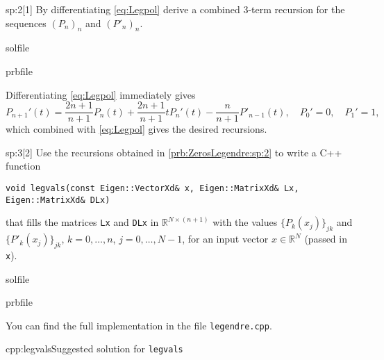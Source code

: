 \begin{samproblem}
\begin{subproblem}{sp:2}[1]
By differentiating \cref{eq:Legpol} derive a combined 3-term recursion for the sequences $(P_n)_n$ and $(P'_n)_n$.
  \begin{samwriteprbpart}{solfile}
    \begin{writeverbatim}{prbfile}
      \begin{samsolution}
        Differentiating \cref{eq:Legpol} immediately gives
        \begin{equation*}
          P_{n+1}'(t)=\frac{2n+1}{n+1}P_n(t) + \frac{2n+1}{n+1} t P_n'(t)-\frac{n}{n+1}P'_{n-1}(t),\quad P_0'=0,\quad P_1'=1,
        \end{equation*}
        which combined with \cref{eq:Legpol} gives the desired recursions.
     \end{samsolution}
    \end{writeverbatim}
  \end{samwriteprbpart}

\end{subproblem}

\begin{subproblem}{sp:3}[2]
  Use the recursions obtained in \ref{prb:ZerosLegendre:sp:2} to write a C++ function
  \begin{lstlisting}[style=cpp]
void legvals(const Eigen::VectorXd& x, Eigen::MatrixXd& Lx, Eigen::MatrixXd& DLx)
  \end{lstlisting}
  that fills the matrices \texttt{Lx} and \texttt{DLx} in $\mathbb{R}^{N\times (n+1)}$ with the values $\{P_k(x_j)\}_{jk}$ and 
  $\{P'_k(x_j)\}_{jk}$, $k=0,\dots,n$, $j=0,\dots,N-1$, for an input vector $x\in \mathbb{R}^N$ (passed in \texttt{x}).
  \begin{samwriteprbpart}{solfile}
    \begin{writeverbatim}{prbfile}
      \begin{samsolution}
        You can find the full implementation in the file \texttt{legendre.cpp}.
        \begin{samcode}[C++-code]{cpp:legvals}{Suggested solution for \texttt{legvals}}
        \end{samcode}
      \end{samsolution}
    \end{writeverbatim}
  \end{samwriteprbpart}


\end{subproblem}
\end{samproblem}
